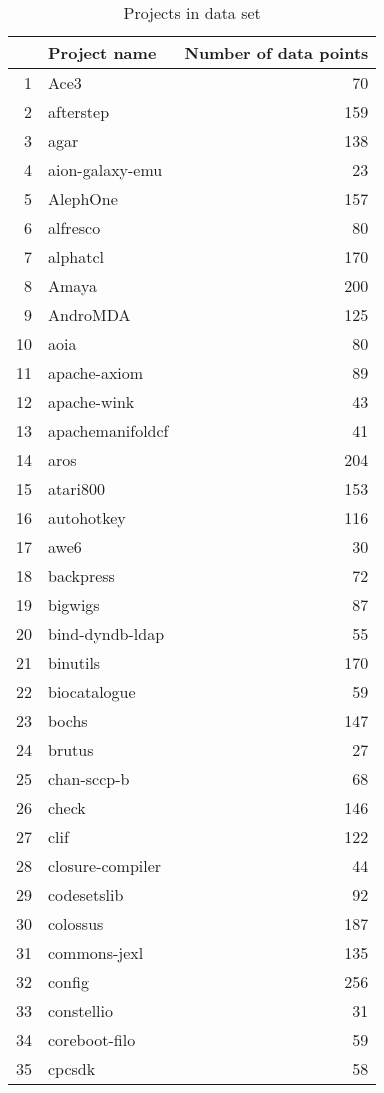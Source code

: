 \begin{table}[!ht]
\caption{Projects in data set}\label{table:projects}
\centering
\begin{tabular}{rlr}
  \hline
 & Project name & Number of data points \\ 
  \hline
1 & Ace3 &  70 \\ 
  2 & afterstep & 159 \\ 
  3 & agar & 138 \\ 
  4 & aion-galaxy-emu &  23 \\ 
  5 & AlephOne & 157 \\ 
  6 & alfresco &  80 \\ 
  7 & alphatcl & 170 \\ 
  8 & Amaya & 200 \\ 
  9 & AndroMDA & 125 \\ 
  10 & aoia &  80 \\ 
  11 & apache-axiom &  89 \\ 
  12 & apache-wink &  43 \\ 
  13 & apachemanifoldcf &  41 \\ 
  14 & aros & 204 \\ 
  15 & atari800 & 153 \\ 
  16 & autohotkey & 116 \\ 
  17 & awe6 &  30 \\ 
  18 & backpress &  72 \\ 
  19 & bigwigs &  87 \\ 
  20 & bind-dyndb-ldap &  55 \\ 
  21 & binutils & 170 \\ 
  22 & biocatalogue &  59 \\ 
  23 & bochs & 147 \\ 
  24 & brutus &  27 \\ 
  25 & chan-sccp-b &  68 \\ 
  26 & check & 146 \\ 
  27 & clif & 122 \\ 
  28 & closure-compiler &  44 \\ 
  29 & codesetslib &  92 \\ 
  30 & colossus & 187 \\ 
  31 & commons-jexl & 135 \\ 
  32 & config & 256 \\ 
  33 & constellio &  31 \\ 
  34 & coreboot-filo &  59 \\ 
  35 & cpcsdk &  58 \\ 

\end{tabular}
\end{table}
